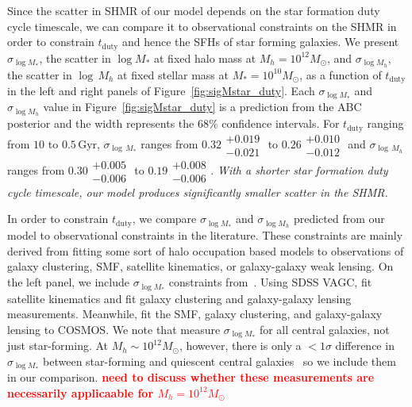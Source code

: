\documentclass[12pt, letterpaper, preprint, tighten]{aastex62}
\newcommand{\todo}[1]{{\bf \textcolor{red}{#1}}}
\begin{document}
Since the scatter in SHMR of our model depends on the star formation duty 
cycle timescale, we can compare it to observational constraints on the 
SHMR in order to constrain $t_\mathrm{duty}$ and hence the SFHs of star 
forming galaxies. We present $\sigma_{\log M_*}$, the scatter in $\log M_*$ 
at fixed halo mass at $M_h = 10^{12} M_\odot$, and $\sigma_{\log M_h}$, 
the scatter in $\log\,M_h$ at fixed stellar mass at $M_* = 10^{10} M_\odot$,
as a function of $t_\mathrm{duty}$ in the left and right panels of  
Figure~\ref{fig:sigMstar_duty}. Each $\sigma_{\log M_*}$ and 
$\sigma_{\log M_h}$ value in Figure~\ref{fig:sigMstar_duty} is a prediction 
from the ABC posterior and the width represents the $68\%$ confidence 
intervals. For $t_\mathrm{duty}$ ranging from $10$ to $0.5\,\mathrm{Gyr}$,
$\sigma_{\log\,M_*}$ ranges from 
{\color{red}
$0.32\substack{+0.019\\ -0.021}$ to $0.26\substack{+0.010\\-0.012}$ and 
}
$\sigma_{\log\,M_h}$ ranges from 
{\color{red}
$0.30\substack{+0.005\\ -0.006}$ to $0.19\substack{+0.008\\-0.006}$. 
}
\emph{With a shorter star formation duty cycle timescale, our model produces 
significantly smaller scatter in the SHMR.}

In order to constrain $t_\mathrm{duty}$, we compare $\sigma_{\log M_*}$ 
and $\sigma_{\log M_h}$ predicted from our model to observational 
constraints in the literature. These constraints are mainly derived from 
fitting some sort of 
halo occupation based models to observations of galaxy clustering, SMF, 
satellite kinematics, or galaxy-galaxy weak lensing. On the left panel, 
we include $\sigma_{\log M_*}$ constraints 
from~\cite{more2011, leauthaud2012, tinker2013, zu2015}. %
Using SDSS VAGC, \cite{more2011} fit satellite kinematics and \cite{zu2015} 
fit galaxy clustering and galaxy-galaxy lensing measurements. Meanwhile, 
\cite{leauthaud2012, tinker2013} fit the SMF, galaxy clustering, and 
galaxy-galaxy lensing to COSMOS. We note that \cite{leauthaud2012, zu2015} 
measure $\sigma_{\log M_*}$ for all central galaxies, not just star-forming. 
At $M_h\sim 10^{12}M_\odot$, however, there is only a $< 1\sigma$ difference 
in $\sigma_{\log M_*}$ between star-forming and quiescent central
galaxies~\citep{more2011, tinker2013} so we include them in our comparison.
\todo{need to discuss whether these measurements are necessarily applicaable 
for $M_h = 10^{12}M_\odot$}
\end{document}

